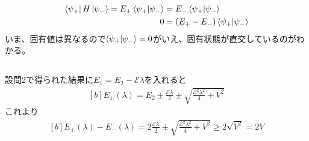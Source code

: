 \documentclass[../../sp_2017.tex]{subfiles}
\begin{document}
\subsection{}
\begin{equation}\begin{aligned}[b]
    \bra{\psi_+}H\ket{\psi_-} = E_+\braket{\psi_+}{\psi_-}&=E_-\braket{\psi_+}{\psi_-}\\
    0 &= (E_+ -E_-)\braket{\psi_+}{\psi_-}
\end{aligned}\end{equation}
いま、固有値は異なるので\(\braket{\psi_+}{\psi_-}=0\)がいえ、固有状態が直交しているのがわかる。

\subsection{}
設問2で得られた結果に\(E_1=E_2-\mathcal{E}\lambda\)を入れると
\begin{equation}\begin{aligned}[b]
    E_\pm(\lambda) = E_2 \pm \frac{\mathcal{E}\lambda}{2}\pm\sqrt{\frac{\mathcal{E}^2\lambda^2}{4}+V^2}
\end{aligned}\end{equation}
これより
\begin{equation}\begin{aligned}[b]
    E_+(\lambda)-E_-(\lambda) = 2\frac{\mathcal{E}\lambda}{2}\pm\sqrt{\frac{\mathcal{E}^2\lambda^2}{4}+V^2}
    \geq 2\sqrt{V^2}=2V
\end{aligned}\end{equation}

\subsection{}
\end{document}

